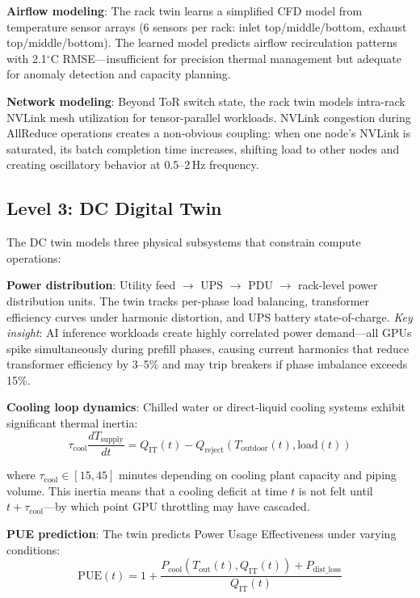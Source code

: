 \documentclass[conference,10pt]{IEEEtran}
\begin{document}
\textbf{Airflow modeling}: The rack twin learns a simplified CFD model from temperature sensor arrays (6 sensors per rack: inlet top/middle/bottom, exhaust top/middle/bottom). The learned model predicts airflow recirculation patterns with 2.1$^\circ$C RMSE---insufficient for precision thermal management but adequate for anomaly detection and capacity planning.

\textbf{Network modeling}: Beyond ToR switch state, the rack twin models intra-rack NVLink mesh utilization for tensor-parallel workloads. NVLink congestion during AllReduce operations creates a non-obvious coupling: when one node's NVLink is saturated, its batch completion time increases, shifting load to other nodes and creating oscillatory behavior at 0.5--2\,Hz frequency.


\subsection{Level 3: DC Digital Twin}

The DC twin models three physical subsystems that constrain compute operations:

\textbf{Power distribution}: Utility feed $\to$ UPS $\to$ PDU $\to$ rack-level power distribution units. The twin tracks per-phase load balancing, transformer efficiency curves under harmonic distortion, and UPS battery state-of-charge. \emph{Key insight}: AI inference workloads create highly correlated power demand---all GPUs spike simultaneously during prefill phases, causing current harmonics that reduce transformer efficiency by 3--5\% and may trip breakers if phase imbalance exceeds 15\%.

\textbf{Cooling loop dynamics}: Chilled water or direct-liquid cooling systems exhibit significant thermal inertia:
\begin{equation}
\tau_{\text{cool}} \frac{dT_{\text{supply}}}{dt} = Q_{\text{IT}}(t) - Q_{\text{reject}}(T_{\text{outdoor}}(t), \text{load}(t))
\end{equation}

where $\tau_{\text{cool}} \in [15, 45]$ minutes depending on cooling plant capacity and piping volume. This inertia means that a cooling deficit at time $t$ is not felt until $t + \tau_{\text{cool}}$---by which point GPU throttling may have cascaded.

\textbf{PUE prediction}: The twin predicts Power Usage Effectiveness under varying conditions:
\begin{equation}
\text{PUE}(t) = 1 + \frac{P_{\text{cool}}(T_{\text{out}}(t), Q_{\text{IT}}(t)) + P_{\text{dist\_loss}}}{Q_{\text{IT}}(t)}
\end{equation}
\end{document}
